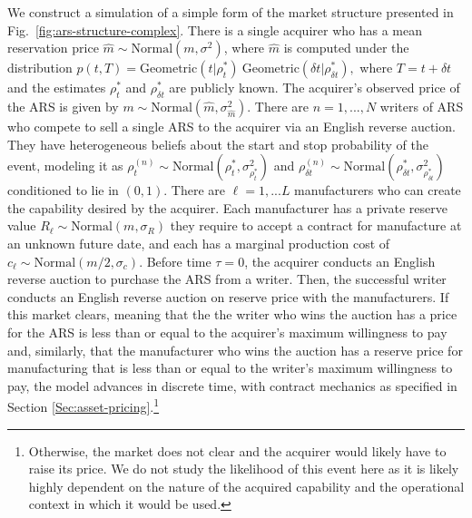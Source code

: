 \documentclass{article}
\begin{document}
We construct a simulation of a simple form of the market structure presented in Fig.\ \ref{fig:ars-structure-complex}.
There is a single acquirer who has a mean reservation price $\hat m \sim \mathrm{Normal}(m, \sigma^2)$, where $\hat m$ is computed under the distribution $p(t,T) = \mathrm{Geometric}(t|\rho^*_t)\ \mathrm{Geometric}(\delta t|\rho^*_{\delta t}),$
where $T = t + \delta t$ and the estimates $\rho^*_t$ and $\rho^*_{\delta t}$ are publicly known.
The acquirer's observed price of the ARS is given by $m \sim \mathrm{Normal}(\hat m, \sigma^2_{\hat m})$.
There are $n=1,...,N$ writers of ARS who compete to sell a single ARS to the acquirer via an English reverse auction. 
They have heterogeneous beliefs about the start and stop probability of the event,
modeling it as $\rho^{(n)}_t\sim \mathrm{Normal}(\rho^*_t,\sigma_{\rho^*_t}^2)$ and
$\rho^{(n)}_{\delta t} \sim \mathrm{Normal}(\rho^*_{\delta t}, \sigma_{\rho^*_{\delta t}}^2)$
conditioned to lie in $(0, 1)$.
There are $\ell= 1,...L$ manufacturers who can create the capability desired by the acquirer.
Each manufacturer has a private reserve value $R_\ell \sim \mathrm{Normal}(m, \sigma_R)$
they require to accept a contract for manufacture at an unknown future date, and each has a 
marginal production cost of $c_\ell \sim \mathrm{Normal}(m/2, \sigma_c)$. 
Before time $\tau = 0$, the acquirer conducts an English reverse auction to purchase the ARS from a writer.
Then, the successful writer conducts an English reverse auction on reserve price with the manufacturers.
If this market clears, meaning that the the writer who wins the auction has a price for the ARS is less than or equal to the acquirer's maximum willingness to pay and, similarly, that the manufacturer who wins the auction has a reserve price for manufacturing that is less than or equal to the writer's maximum willingness to pay, the model advances in discrete time, with contract mechanics as specified in Section \ref{Sec:asset-pricing}.\footnote{
Otherwise, the market does not clear and the acquirer would likely have to raise its price. 
We do not study the likelihood of this event here as it is likely highly dependent on the nature of the acquired capability and the operational context in which it would be used.
}
\end{document}
